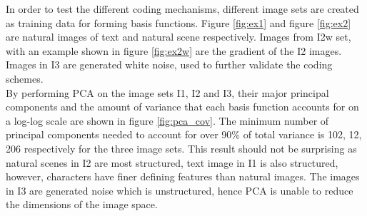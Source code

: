 \documentclass[journal]{IEEEtran}
\begin{document}
In order to test the different coding mechanisms, different image sets are created as training data for forming basis functions. Figure \ref{fig:ex1} and figure \ref{fig:ex2} are natural images of text and natural scene respectively. Images from I2w set, with an example shown in figure \ref{fig:ex2w} are the gradient of the I2 images. Images in I3 are generated white noise, used to further validate the coding schemes.\\
By performing PCA on the image sets I1, I2 and I3, their major principal components and the amount of variance that each basis function accounts for on a log-log scale are shown in figure \ref{fig:pca_cov}. The minimum number of principal components needed to account for over 90\% of total variance is 102, 12, 206 respectively for the three image sets. This result should not be surprising as natural scenes in I2 are most structured, text image in I1 is also structured, however, characters have finer defining features than natural images. The images in I3 are generated noise which is unstructured, hence PCA is unable to reduce the dimensions of the image space. \\
\end{document}
